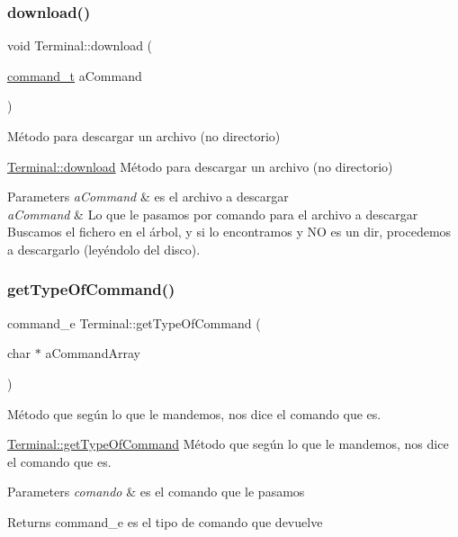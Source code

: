 \subsubsection{\texorpdfstring{download()}{download()}}
{\footnotesize\ttfamily void Terminal\+::download (\begin{DoxyParamCaption}\item[{\hyperlink{structcommand__t}{command\+\_\+t}}]{a\+Command }\end{DoxyParamCaption})}



Método para descargar un archivo (no directorio) 

\hyperlink{classTerminal_ae65a3c6d061449b0607e3caa1691b3c7}{Terminal\+::download} Método para descargar un archivo (no directorio)


\begin{DoxyParams}{Parameters}
{\em a\+Command} & es el archivo a descargar\\
\hline
{\em a\+Command} & Lo que le pasamos por comando para el archivo a descargar Buscamos el fichero en el árbol, y si lo encontramos y NO es un dir, procedemos a descargarlo (leyéndolo del disco). \\
\hline
\end{DoxyParams}
\mbox{\label{classTerminal_a32bc1feca07a366d65f755e74c270766}} 
\subsubsection{\texorpdfstring{get\+Type\+Of\+Command()}{getTypeOfCommand()}}
{\footnotesize\ttfamily command\+\_\+e Terminal\+::get\+Type\+Of\+Command (\begin{DoxyParamCaption}\item[{char $\ast$}]{a\+Command\+Array }\end{DoxyParamCaption})}



Método que según lo que le mandemos, nos dice el comando que es. 

\hyperlink{classTerminal_a32bc1feca07a366d65f755e74c270766}{Terminal\+::get\+Type\+Of\+Command} Método que según lo que le mandemos, nos dice el comando que es.


\begin{DoxyParams}{Parameters}
{\em comando} & es el comando que le pasamos \\
\hline
\end{DoxyParams}
\begin{DoxyReturn}{Returns}
command\+\_\+e es el tipo de comando que devuelve
\end{DoxyReturn}

